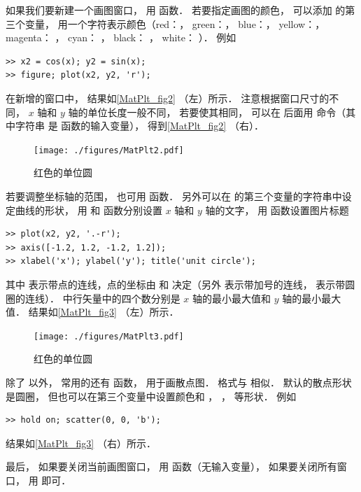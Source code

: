 如果我们要新建一个画图窗口， 用  函数． 若要指定画图的颜色， 可以添加  的第三个变量， 用一个字符表示颜色（red：， green：， blue：， yellow：， magenta： ， cyan： ， black： ， white： ）． 例如
\begin{lstlisting}[language=MatlabCom]
>> x2 = cos(x); y2 = sin(x);
>> figure; plot(x2, y2, 'r');
\end{lstlisting}
在新增的窗口中， 结果如\autoref{MatPlt_fig2} （左）所示． 注意根据窗口尺寸的不同， $x$ 轴和 $y$ 轴的单位长度一般不同， 若要使其相同， 可以在  后面用  命令（其中字符串  是  函数的输入变量）， 得到\autoref{MatPlt_fig2} （右）．
\begin{figure}[ht]
\centering
\texttt{[image: ./figures/MatPlt2.pdf]}
\caption{红色的单位圆} \label{MatPlt_fig2}
\end{figure}
若要调整坐标轴的范围， 也可用  函数． 另外可以在  的第三个变量的字符串中设定曲线的形状， 用  和  函数分别设置 $x$ 轴和 $y$ 轴的文字， 用  函数设置图片标题
\begin{lstlisting}[language=MatlabCom]
>> plot(x2, y2, '.-r');
>> axis([-1.2, 1.2, -1.2, 1.2]);
>> xlabel('x'); ylabel('y'); title('unit circle');
\end{lstlisting}
其中 表示带点的连线，点的坐标由  和  决定（另外  表示带加号的连线，  表示带圆圈的连线）．  中行矢量中的四个数分别是 $x$ 轴的最小最大值和 $y$ 轴的最小最大值． 结果如\autoref{MatPlt_fig3} （左）所示．
\begin{figure}[ht]
\centering
\texttt{[image: ./figures/MatPlt3.pdf]}
\caption{红色的单位圆} \label{MatPlt_fig3}
\end{figure}

除了  以外， 常用的还有  函数， 用于画散点图． 格式与  相似． 默认的散点形状是圆圈， 但也可以在第三个变量中设置颜色和 ， ，  等形状． 例如
\begin{lstlisting}[language=MatlabCom]
>> hold on; scatter(0, 0, 'b');
\end{lstlisting}
结果如\autoref{MatPlt_fig3} （右）所示．

最后， 如果要关闭当前画图窗口， 用  函数（无输入变量）， 如果要关闭所有窗口， 用  即可．